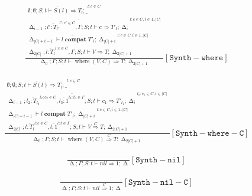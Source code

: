 \documentclass{scrartcl}
\DeclareMathOperator{\where}{where}
\DeclareMathOperator{\compat}{\mathbf{compat}}
\DeclareMathOperator{\gtypes}{\Delta}
\begin{document}
    \begin{align*}
    \frac{
        \begin{matrix}
        \overline{\emptyset; \emptyset; S; t \vdash S(l) \Rightarrow T_l; \_}^{l : c \in C} \\
        \overline{\gtypes_{i-1}; \overline{l' : T_{l'}}^{l' : c' \in C}, \Gamma; S; t \vdash c \Rightarrow T'_l; \gtypes_{i}}^{l : c \in C, i \in 1 .. |C|} \\
        \overline{\gtypes_{|C|+i-1} \vdash l \compat T'_l; \gtypes_{|C|+i}}^{l : c \in C, i \in 1 .. |C|} \\
        \gtypes_{2|C|}; \overline{l : T_l}^{l : c \in C}, \Gamma; S; t \vdash V \Rightarrow T; \gtypes_{2|C|+1}
        \end{matrix}
    }{
        \gtypes_0; \Gamma; S; t \vdash \where(V, C) \Rightarrow T; \gtypes_{2|C|+1}
    }[\mathtt{Synth-where}]
    \end{align*}
    
    \begin{align*}
    \frac{
        \begin{matrix}
        \overline{\emptyset; \emptyset; S; t \vdash S(l) \Rightarrow T_l; \_}^{l : c \in C} \\
        \overline{\gtypes_{i-1}; \overline{l_2 : T_{l_2}}^{l_2 : c_2 \in C}, \overline{l_3 : 1}^{l_3 : t_3 \in \Gamma}; S; t \vdash c_1 \Rightarrow T'_{l_1}; \gtypes_i}^{l_1: c_1 \in C, i \in |C|} \\
        \overline{\gtypes_{|C|+i-1} \vdash l \compat T'_l; \gtypes_{|C|+i}}^{l : c \in C, i \in 1 .. |C|} \\
        \gtypes_{2|C|}; \overline{l : T_l}^{l: c \in C}, \overline{l : 1}^{l : t \in \Gamma}; S; t \vdash V \overset{C}{\Rightarrow} T; \gtypes_{2|C|+1}
        \end{matrix}
    }{
        \gtypes_0; \Gamma; S; t \vdash \where(V, C) \overset{C}{\Rightarrow} T; \gtypes_{2|C|+1}
    }[\mathtt{Synth-where-C}]
    \end{align*}
    
    \begin{align*}
    \frac{}{
        \gtypes; \Gamma; S; t \vdash nil \Rightarrow 1; \gtypes
    }[\mathtt{Synth-nil}]
    \end{align*}
    
    \begin{align*}
    \frac{}{
        \gtypes; \Gamma; S; t \vdash nil \overset{C}{\Rightarrow} 1; \gtypes
    }[\mathtt{Synth-nil-C}]
    \end{align*}
    
\end{document}

